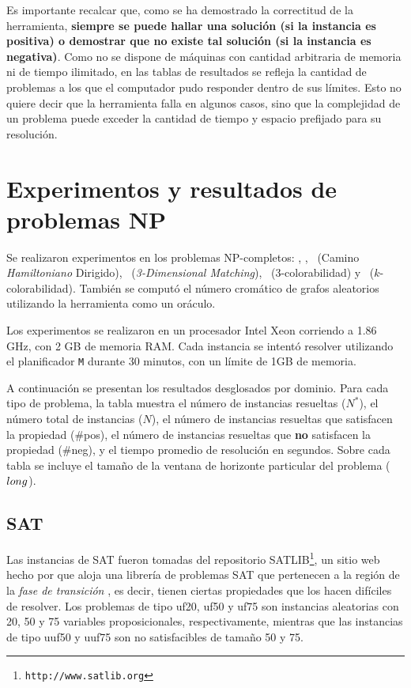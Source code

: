 Es importante recalcar que, como se ha demostrado la correctitud de la
herramienta, \textbf{siempre se puede hallar una solución (si la instancia es
positiva) o demostrar que no existe tal solución (si la instancia es
negativa)}. Como no se dispone de máquinas con cantidad arbitraria de memoria
ni de tiempo ilimitado, en las tablas de resultados se refleja la cantidad de
problemas a los que el computador pudo responder dentro de sus límites. Esto no
quiere decir que la herramienta falla en algunos casos, sino que la complejidad
de un problema puede exceder la cantidad de tiempo y espacio prefijado para su
resolución.

\section{Experimentos y resultados de problemas NP}
Se realizaron experimentos en los problemas NP-completos: \SAT, \CLIQUE, \CHD
\ (Camino \textit{Hamiltoniano} Dirigido),
\TDM\ (\textit{3-Dimensional Matching}), \TCOL\ (3-colorabilidad) y \KCOL
\ ($k$-colorabilidad).
También se computó el número cromático de grafos aleatorios utilizando la
herramienta como un oráculo.

Los experimentos se realizaron en un procesador Intel Xeon corriendo a 1.86 GHz,
con 2 GB de memoria RAM. Cada instancia se intentó resolver utilizando el
planificador \texttt{M} durante 30 minutos, con un límite de 1GB de memoria.

A continuación se presentan los resultados desglosados por dominio.
Para cada tipo de problema, la tabla muestra el número de instancias resueltas
($N^*$), el número total de instancias ($N$), el número de instancias resueltas
que satisfacen la propiedad (\#pos), el número de instancias resueltas que
\textbf{no} satisfacen la propiedad (\#neg), y el tiempo promedio de resolución
en segundos. Sobre cada tabla se incluye el tamaño de la ventana de horizonte
particular del problema ($long$).

\subsection{SAT}
Las instancias de SAT fueron tomadas del repositorio
SATLIB\footnote{\texttt{http://www.satlib.org}}, un sitio web hecho por
\cite{hoos:satlib} que aloja una librería de problemas SAT que pertenecen a la
región de la \textit{fase de transición} \citep{gent:transition}, es decir,
tienen ciertas propiedades que los hacen difíciles de resolver.
Los problemas de tipo uf20, uf50 y uf75 son instancias aleatorias con 20, 50 y
75 variables proposicionales, respectivamente, mientras que las instancias de
tipo uuf50 y uuf75 son no satisfacibles de tamaño 50 y 75.

